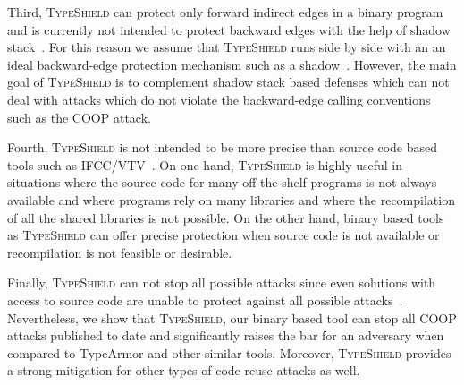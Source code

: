 Third, \textsc{TypeShield} can protect only forward indirect edges in a binary program and is currently not 
intended to protect backward edges with the help of shadow stack~\cite{dang:asiaccs}. For this reason we assume that 
\textsc{TypeShield} runs side by side with an an ideal backward-edge protection mechanism such as a shadow~\cite{conti:ccs}. 
However, the main goal of \textsc{TypeShield} is to complement shadow stack based defenses which can not deal with attacks 
which do not violate the backward-edge calling conventions such as the COOP attack.

Fourth, \textsc{TypeShield} is not intended to be more precise than source code based tools such as 
IFCC/VTV~\cite{vtv:tice}.
On one hand, \textsc{TypeShield} is highly useful in situations where
the source code for many off-the-shelf programs is not always available and where
programs rely on many libraries and where the recompilation of all the shared libraries 
is not possible. On the other hand, binary based tools as \textsc{TypeShield} can offer precise protection when
source code is not available or recompilation is not feasible or desirable.

Finally, \textsc{TypeShield} can not stop all possible attacks since even solutions 
with access to source code are unable to protect against all possible attacks~\cite{carlini:bending}.
Nevertheless, we show that \textsc{TypeShield}, our binary based tool can stop all 
COOP attacks published to date and significantly raises the bar for an adversary when compared to
TypeArmor and other similar tools. Moreover, \textsc{TypeShield} provides a strong mitigation 
for other types of code-reuse attacks as well.
